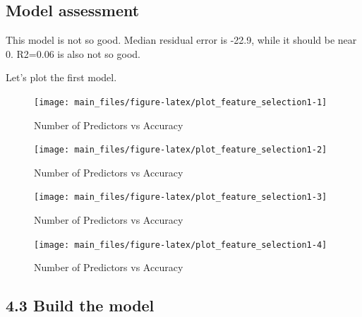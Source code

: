 \hypertarget{model-assessment}{%
\subsection{Model assessment}\label{model-assessment}}

This model is not so good. Median residual error is -22.9, while it
should be near 0. R2=0.06 is also not so good.

Let's plot the first model.

\begin{Schunk}
\begin{figure}[H]

{\centering \texttt{[image: main\_files/figure-latex/plot\_feature\_selection1-1]} 

}

\caption[Number of Predictors vs Accuracy]{Number of Predictors vs Accuracy}\label{fig:plot_feature_selection11}
\end{figure}
\begin{figure}[H]

{\centering \texttt{[image: main\_files/figure-latex/plot\_feature\_selection1-2]} 

}

\caption[Number of Predictors vs Accuracy]{Number of Predictors vs Accuracy}\label{fig:plot_feature_selection12}
\end{figure}
\begin{figure}[H]

{\centering \texttt{[image: main\_files/figure-latex/plot\_feature\_selection1-3]} 

}

\caption[Number of Predictors vs Accuracy]{Number of Predictors vs Accuracy}\label{fig:plot_feature_selection13}
\end{figure}
\begin{figure}[H]

{\centering \texttt{[image: main\_files/figure-latex/plot\_feature\_selection1-4]} 

}

\caption[Number of Predictors vs Accuracy]{Number of Predictors vs Accuracy}\label{fig:plot_feature_selection14}
\end{figure}
\end{Schunk}

\hypertarget{build-the-model-1}{%
\subsection{4.3 Build the model}\label{build-the-model-1}}

